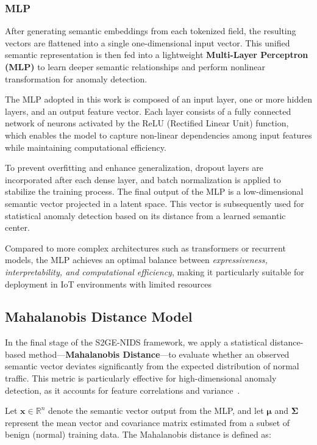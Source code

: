 \begin{ZhChapter}
    \subsubsection{MLP}
    After generating semantic embeddings from each tokenized field, the resulting vectors are flattened into a single one-dimensional input vector. This unified semantic representation is then fed into a lightweight \textbf{Multi-Layer Perceptron (MLP)} to learn deeper semantic relationships and perform nonlinear transformation for anomaly detection.

    The MLP adopted in this work is composed of an input layer, one or more hidden layers, and an output feature vector. Each layer consists of a fully connected network of neurons activated by the ReLU (Rectified Linear Unit) function, which enables the model to capture non-linear dependencies among input features while maintaining computational efficiency.

    To prevent overfitting and enhance generalization, dropout layers are incorporated after each dense layer, and batch normalization is applied to stabilize the training process. The final output of the MLP is a low-dimensional semantic vector projected in a latent space. This vector is subsequently used for statistical anomaly detection based on its distance from a learned semantic center.

    Compared to more complex architectures such as transformers or recurrent models, the MLP achieves an optimal balance between \textit{expressiveness, interpretability, and computational efficiency}, making it particularly suitable for deployment in IoT environments with limited resources~\cite{mlp2001universal}


    \subsection{Mahalanobis Distance Model}
    In the final stage of the S2GE-NIDS framework, we apply a statistical distance-based method—\textbf{Mahalanobis Distance}—to evaluate whether an observed semantic vector deviates significantly from the expected distribution of normal traffic. This metric is particularly effective for high-dimensional anomaly detection, as it accounts for feature correlations and variance~\cite{de2000mahalanobis}.

    Let $\mathbf{x} \in \mathbb{R}^n$ denote the semantic vector output from the MLP, and let $\boldsymbol{\mu}$ and $\boldsymbol{\Sigma}$ represent the mean vector and covariance matrix estimated from a subset of benign (normal) training data. The Mahalanobis distance is defined as:


\end{ZhChapter}
